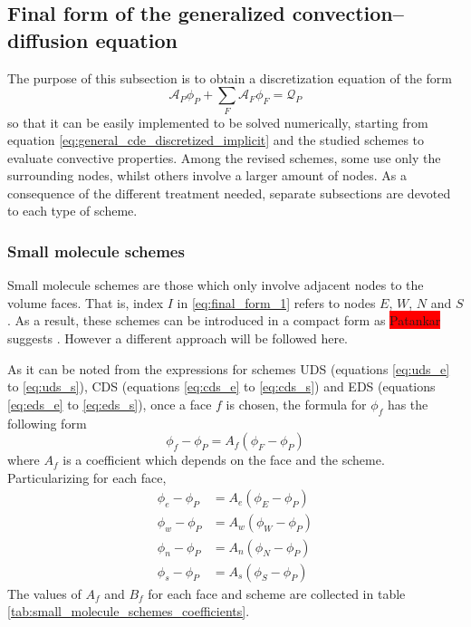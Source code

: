 \subsection{Final form of the generalized convection--diffusion equation}

The purpose of this subsection is to obtain a discretization equation of the
form
\begin{equation} \label{eq:final_form_1}
	\mathcal{A}_P \phi_P + \sum_F \mathcal{A}_F \phi_F = \mathcal{Q}_P
\end{equation}
so that it can be easily implemented to be solved numerically, starting from
equation \eqref{eq:general_cde_discretized_implicit} and the studied schemes to
evaluate convective properties. Among the revised schemes, some use only the
surrounding nodes, whilst others involve a larger amount of nodes. As a
consequence of the different treatment needed, separate subsections are devoted
to each type of scheme.

\subsubsection{Small molecule schemes}

Small molecule schemes are those which only involve adjacent nodes to the volume
faces. That is, index $I$ in \eqref{eq:final_form_1} refers to nodes $E$, $W$,
$N$ and $S$. As a result, these schemes can be introduced in a compact form as
\colorbox{red}{Patankar} suggests \cite{patankar2008numerical}. However a
different approach will be followed here. 

As it can be noted from the expressions for schemes UDS (equations
\eqref{eq:uds_e} to \eqref{eq:uds_s}), CDS (equations \eqref{eq:cds_e} to
\eqref{eq:cds_s}) and EDS (equations \eqref{eq:eds_e} to \eqref{eq:eds_s}), once
a face $f$ is chosen, the formula for $\phi_f$ has the following form
\begin{equation} \label{eq:small_molecule_schemes_1}
	\phi_f - \phi_P = A_f (\phi_F - \phi_P)
\end{equation}
where $A_f$ is a coefficient which depends on the face and the scheme.
Particularizing for each face,
\begin{align}	
	\phi_e - \phi_P &= A_e (\phi_E - \phi_P) \label{eq:small_molecule_schemes_2} \\ 
	\phi_w - \phi_P &= A_w (\phi_W - \phi_P) \\
	\phi_n - \phi_P &= A_n (\phi_N - \phi_P) \\
	\phi_s - \phi_P &= A_s (\phi_S - \phi_P) \label{eq:small_molecule_schemes_3} 
\end{align}
The values of $A_f$ and $B_f$ for each face and scheme are collected in table
\ref{tab:small_molecule_schemes_coefficients}.

